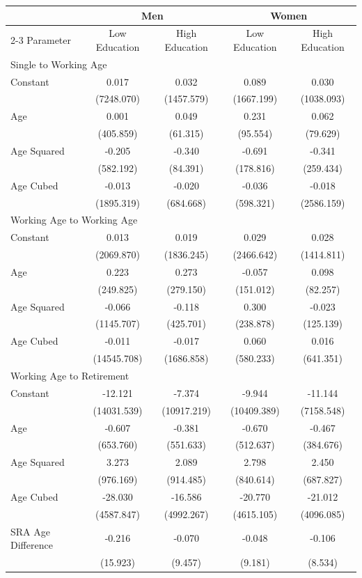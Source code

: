 \begin{tabular}{lcccc}
    \toprule
     & \multicolumn{2}{c}{Men} & \multicolumn{2}{c}{Women} \\
    \cline{2-3} \cline{4-5}
    Parameter & Low Education & High Education & Low Education & High Education \\
    \midrule
    \multicolumn{5}{l}{Single to Working Age} \\
    \midrule
    Constant & 0.017 & 0.032 & 0.089 & 0.030 \\
     & (7248.070) & (1457.579) & (1667.199) & (1038.093) \\
    Age & 0.001 & 0.049 & 0.231 & 0.062 \\
     & (405.859) & (61.315) & (95.554) & (79.629) \\
    Age Squared & -0.205 & -0.340 & -0.691 & -0.341 \\
     & (582.192) & (84.391) & (178.816) & (259.434) \\
    Age Cubed & -0.013 & -0.020 & -0.036 & -0.018 \\
     & (1895.319) & (684.668) & (598.321) & (2586.159) \\
    \midrule
    \multicolumn{5}{l}{Working Age to Working Age} \\
    \midrule
    Constant & 0.013 & 0.019 & 0.029 & 0.028 \\
     & (2069.870) & (1836.245) & (2466.642) & (1414.811) \\
    Age & 0.223 & 0.273 & -0.057 & 0.098 \\
     & (249.825) & (279.150) & (151.012) & (82.257) \\
    Age Squared & -0.066 & -0.118 & 0.300 & -0.023 \\
     & (1145.707) & (425.701) & (238.878) & (125.139) \\
    Age Cubed & -0.011 & -0.017 & 0.060 & 0.016 \\
     & (14545.708) & (1686.858) & (580.233) & (641.351) \\
    \midrule
    \multicolumn{5}{l}{Working Age to Retirement} \\
    \midrule
    Constant & -12.121 & -7.374 & -9.944 & -11.144 \\
     & (14031.539) & (10917.219) & (10409.389) & (7158.548) \\
    Age & -0.607 & -0.381 & -0.670 & -0.467 \\
     & (653.760) & (551.633) & (512.637) & (384.676) \\
    Age Squared & 3.273 & 2.089 & 2.798 & 2.450 \\
     & (976.169) & (914.485) & (840.614) & (687.827) \\
    Age Cubed & -28.030 & -16.586 & -20.770 & -21.012 \\
     & (4587.847) & (4992.267) & (4615.105) & (4096.085) \\
    SRA Age Difference & -0.216 & -0.070 & -0.048 & -0.106 \\
     & (15.923) & (9.457) & (9.181) & (8.534) \\
    \bottomrule
\end{tabular}

